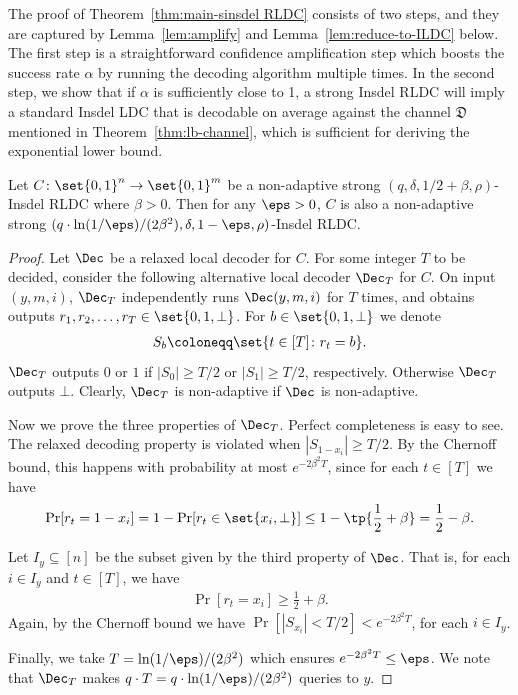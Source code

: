 The proof of Theorem~\ref{thm:main-sinsdel RLDC} consists of two steps, and they are captured by Lemma~\ref{lem:amplify} and Lemma~\ref{lem:reduce-to-ILDC} below. The first step is a straightforward confidence amplification step which boosts the success rate $\alpha$ by running the decoding algorithm multiple times. In the second step, we show that if $\alpha$ is sufficiently close to 1, a strong Insdel RLDC will imply a standard Insdel LDC that is decodable on average against the channel $\mathfrak{D}$ mentioned in Theorem~\ref{thm:lb-channel}, which is sufficient for deriving the exponential lower bound.

\begin{lemma} \label{lem:amplify}
Let $C \colon \set{0,1}^n \rightarrow \set{0,1}^m$ be a non-adaptive strong $(q,\delta,1/2+\beta,\rho)$-Insdel RLDC where $\beta > 0$. Then for any $\eps > 0$, $C$ is also a non-adaptive strong $(q\cdot \ln(1/\eps)/(2\beta^2), \delta, 1-\eps, \rho)$-Insdel RLDC.
\end{lemma}
\begin{proof}
Let $\Dec$ be a relaxed local decoder for $C$. For some integer $T$ to be decided, consider the following alternative local decoder $\Dec_{T}$ for $C$. On input $(y, m, i)$, $\Dec_T$ independently runs $\Dec(y, m, i)$ for $T$ times, and obtains outputs $r_1, r_2,\dots, r_T \in \set{0,1,\bot}$. For $b \in \set{0,1,\bot}$ we denote 
\begin{align*}
S_b \coloneqq \set{t \in [T] \colon r_t = b}. 
\end{align*}
$\Dec_T$ outputs $0$ or $1$ if $|S_0| \ge T/2$ or $|S_1| \ge T/2$, respectively. Otherwise $\Dec_T$ outputs $\bot$. Clearly, $\Dec_T$ is non-adaptive if $\Dec$ is non-adaptive.

Now we prove the three properties of $\Dec_T$. Perfect completeness is easy to see. The relaxed decoding property is violated when $|S_{1-x_i}| \ge T/2$. By the Chernoff bound, this happens with probability at most $e^{-2\beta^2 T}$, since for each $t \in [T]$ we have 
\begin{align*}
\Pr[r_t = 1-x_i] = 1-\Pr[r_t \in \set{x_i, \perp}] \le 1 - \tp{\frac{1}{2} + \beta} = \frac{1}{2}-\beta.
\end{align*}

Let $I_y \subseteq [n]$ be the subset given by the third property of $\Dec$. That is, for each $i \in I_y$ and $t \in [T]$, we have 
\begin{align*}
\Pr[r_t = x_i] \ge \frac{1}{2}+\beta.
\end{align*}
Again, by the Chernoff bound we have $\Pr[|S_{x_i}| < T/2] < e^{-2\beta^2 T}$, for each $i \in I_y$.

Finally, we take $T = \ln(1/\eps)/(2\beta^2)$ which ensures $e^{-2\beta^2 T} \le \eps$. We note that $\Dec_{T}$ makes $q\cdot T = q\cdot \ln(1/\eps)/(2\beta^2)$ queries to $y$.
\end{proof}

